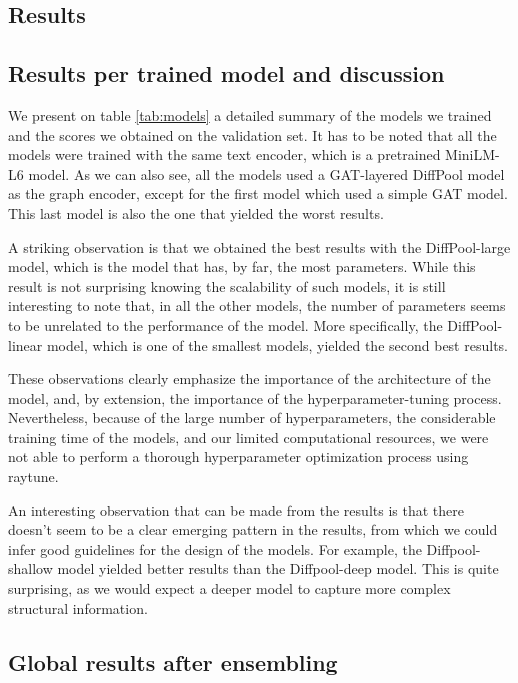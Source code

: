 \documentclass[switch, 12pt]{article}
\begin{document}
\begin{multicols}{2}
    \section{Results}
    \subsection{Results per trained model and discussion}
    We present on table \ref{tab:models} a detailed summary of the models we trained and the scores we obtained on the validation set. It has to be noted that all the models were trained with the same text encoder, which is a pretrained MiniLM-L6 model. As we can also see, all the models used a GAT-layered DiffPool model as the graph encoder, except for the first model which used a simple GAT model. This last model is also the one that yielded the worst results.

    A striking observation is that we obtained the best results with the DiffPool-large model, which is the model that has, by far, the most parameters. While this result is not surprising knowing the scalability of such models, it is still interesting to note that, in all the other models, the number of parameters seems to be unrelated to the performance of the model. More specifically, the DiffPool-linear model, which is one of the smallest models, yielded the second best results.

    These observations clearly emphasize the importance of the architecture of the model, and, by extension, the importance of the hyperparameter-tuning process. Nevertheless, because of the large number of hyperparameters, the considerable training time of the models, and our limited computational resources, we were not able to perform a thorough hyperparameter optimization process using raytune.

    An interesting observation that can be made from the results is that there doesn't seem to be a clear emerging pattern in the results, from which we could infer good guidelines for the design of the models. For example, the Diffpool-shallow model yielded better results than the Diffpool-deep model. This is quite surprising, as we would expect a deeper model to capture more complex structural information.


    \subsection{Global results after ensembling}

\end{multicols}
\end{document}

